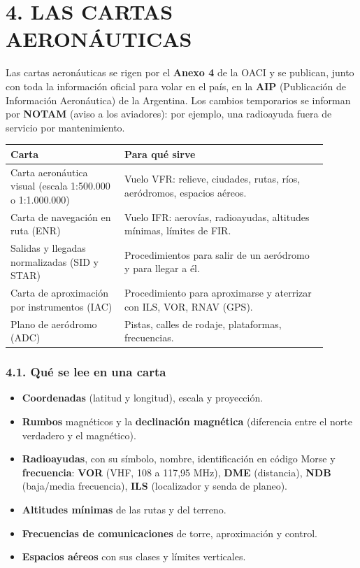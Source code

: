 \section*{4. LAS CARTAS AERONÁUTICAS}

Las cartas aeronáuticas se rigen por el \textbf{Anexo 4} de la OACI y se publican, junto con toda la
información oficial para volar en el país, en la \textbf{AIP} (Publicación de Información
Aeronáutica) de la Argentina. Los cambios temporarios se informan por \textbf{NOTAM} (aviso a los
aviadores): por ejemplo, una radioayuda fuera de servicio por mantenimiento.

\begin{center}
\small
\begin{tabular}{|p{0.32\linewidth}|p{0.58\linewidth}|}
\hline
\textbf{Carta} & \textbf{Para qué sirve} \\ \hline
Carta aeronáutica visual (escala 1:500.000 o 1:1.000.000) & Vuelo VFR: relieve, ciudades, rutas,
ríos, aeródromos, espacios aéreos. \\ \hline
Carta de navegación en ruta (ENR) & Vuelo IFR: aerovías, radioayudas, altitudes mínimas, límites
de FIR. \\ \hline
Salidas y llegadas normalizadas (SID y STAR) & Procedimientos para salir de un aeródromo y para
llegar a él. \\ \hline
Carta de aproximación por instrumentos (IAC) & Procedimiento para aproximarse y aterrizar con
ILS, VOR, RNAV (GPS). \\ \hline
Plano de aeródromo (ADC) & Pistas, calles de rodaje, plataformas, frecuencias. \\ \hline
\end{tabular}
\end{center}

\subsubsection*{4.1. Qué se lee en una carta}
\begin{itemize}
  \item \textbf{Coordenadas} (latitud y longitud), escala y proyección.
  \item \textbf{Rumbos} magnéticos y la \textbf{declinación magnética} (diferencia entre el norte
        verdadero y el magnético).
  \item \textbf{Radioayudas}, con su símbolo, nombre, identificación en código Morse y
        \textbf{frecuencia}: \textbf{VOR} (VHF, 108 a 117,95 MHz), \textbf{DME} (distancia),
        \textbf{NDB} (baja/media frecuencia), \textbf{ILS} (localizador y senda de planeo).
  \item \textbf{Altitudes mínimas} de las rutas y del terreno.
  \item \textbf{Frecuencias de comunicaciones} de torre, aproximación y control.
  \item \textbf{Espacios aéreos} con sus clases y límites verticales.
\end{itemize}

